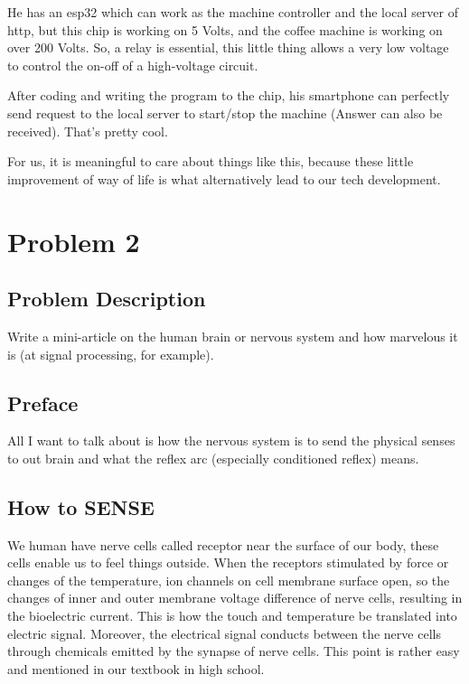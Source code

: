 \documentclass{article}
\begin{document}
He has an esp32 which can work as the machine controller and the local server of http, but this chip is working on 5 Volts, and the coffee machine is working on over 200 Volts. So, a relay is essential, this little thing allows a very low voltage to control the on-off of a high-voltage circuit.

After coding and writing the program to the chip, his smartphone can perfectly send request to the local server to start/stop the machine (Answer can also be received). That's pretty cool.

For us, it is meaningful to care about things like this, because these little improvement of way of life is what alternatively lead to our tech development.

\section{Problem 2}

\subsection{Problem Description}

Write a mini-article on the human brain or nervous system and how marvelous it is (at signal processing, for example).
\subsection{Preface}

All I want to talk about is how the nervous system is to send the physical senses to out brain and what the reflex arc (especially conditioned reflex) means.

\subsection{How to SENSE}

We human have nerve cells called receptor near the surface of our body, these cells enable us to feel things outside. When the receptors stimulated by force or changes of the temperature, ion channels on cell membrane surface open, so the changes of inner and outer membrane voltage difference of nerve cells, resulting in the bioelectric current. This is how the touch and temperature be translated into electric signal. Moreover, the electrical signal conducts between the nerve cells through chemicals emitted by the synapse of nerve cells.\cite{receptor} This point is rather easy and mentioned in our textbook in high school.
\end{document}
